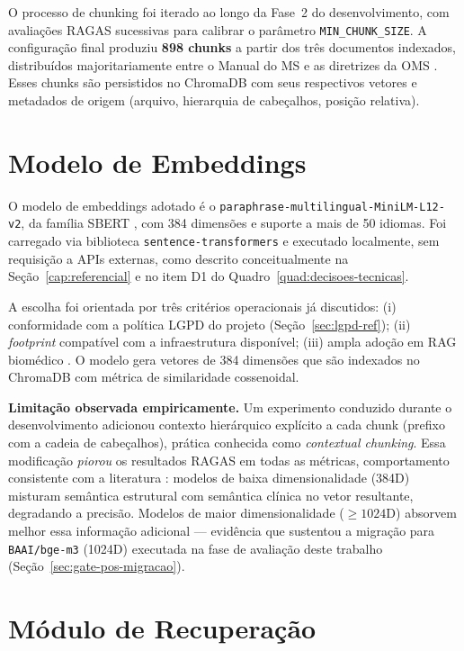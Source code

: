\documentclass[
  12pt,
  oneside,
  a4paper,
  english,
  brazil
]{abntex2}
\begin{document}
O processo de chunking foi iterado ao longo da Fase~2 do desenvolvimento,
com avaliações RAGAS sucessivas para calibrar o parâmetro \texttt{MIN\_CHUNK\_SIZE}.
A configuração final produziu \textbf{898 chunks} a partir dos três
documentos indexados, distribuídos majoritariamente entre o Manual do MS
\cite{brasil2022} e as diretrizes da OMS \cite{who2018}. Esses chunks
são persistidos no ChromaDB com seus respectivos vetores e metadados de origem
(arquivo, hierarquia de cabeçalhos, posição relativa).

\section{Modelo de Embeddings}

O modelo de embeddings adotado é o
\texttt{paraphrase-multilingual-MiniLM-L12-v2}, da família SBERT
\cite{reimers2019}, com 384 dimensões e suporte a mais de 50 idiomas. Foi carregado
via biblioteca \texttt{sentence-transformers} e executado localmente, sem requisição
a APIs externas, como descrito conceitualmente na
Seção~\ref{cap:referencial} e no item D1 do
Quadro~\ref{quad:decisoes-tecnicas}.

A escolha foi orientada por três critérios operacionais já discutidos: (i)
conformidade com a política LGPD do projeto (Seção~\ref{sec:lgpd-ref}); (ii)
\textit{footprint} compatível com a infraestrutura disponível; (iii) ampla
adoção em RAG biomédico \cite{ocaf2024}. O modelo gera vetores de 384 dimensões
que são indexados no ChromaDB com métrica de similaridade cossenoidal.

\textbf{Limitação observada empiricamente.} Um experimento conduzido
durante o desenvolvimento adicionou contexto hierárquico explícito a
cada chunk (prefixo com a cadeia de cabeçalhos), prática conhecida como
\textit{contextual chunking}. Essa modificação \textit{piorou} os
resultados RAGAS em todas as métricas, comportamento consistente com a
literatura \cite{SHTI2023}: modelos de baixa dimensionalidade (384D)
misturam semântica estrutural com semântica clínica no vetor
resultante, degradando a precisão. Modelos de maior dimensionalidade
($\geq 1024$D) absorvem melhor essa informação adicional --- evidência
que sustentou a migração para \texttt{BAAI/bge-m3} (1024D) executada na
fase de avaliação deste trabalho (Seção~\ref{sec:gate-pos-migracao}).

\section{Módulo de Recuperação}
\end{document}
